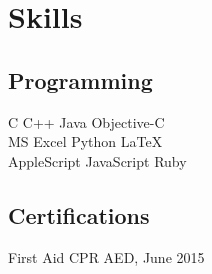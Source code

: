 \documentclass[letterpaper]{deedy-resume} %
\begin{document}
\begin{minipage}[t]{0.39\textwidth}
\section{Skills}

\subsection{Programming}

C \textbullet{} C++ \textbullet{} Java \textbullet{} Objective-C \\
MS Excel \textbullet{} Python \textbullet{} \LaTeX\\ 
AppleScript \textbullet{} JavaScript \textbullet{} Ruby \\

\sectionspace %

\subsection{Certifications}
First Aid CPR AED, June 2015



\end{minipage} %
\hfill
%
%
\end{document}

